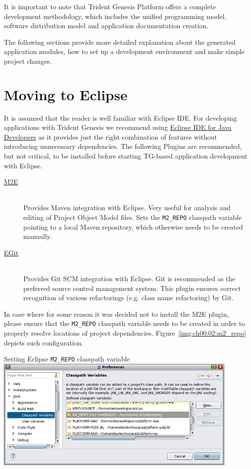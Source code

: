   It is important to note that Trident Genesis Platform offers a complete development methodology, which includes the unified programming model, software distribution model and application documentation creation.
  
  The following sections provide more detailed explanation about the generated application modules, how to set up a development environment and make simple project changes.

\section{Moving to Eclipse}
  It is assumed that the reader is well familiar with Eclipse IDE.
  For developing applications with Trident Genesis we recommend using \href{http://www.eclipse.org/downloads}{Eclipse IDE for Java Developers} as it provides just the right combination of features without introducing unnecessary dependencies.
  The following Plugins are recommended, but not critical, to be installed before starting TG-based application development with Eclipse.

  \begin{description}
    \item[\href{http://www.eclipse.org/m2e/}{M2E}] \hfill \\
	Provides Maven integration with Eclipse. 
	Very useful for analysis and editing of Project Object Model files.
	Sets the \texttt{M2\_REPO} classpath variable pointing to a local Maven repository, which otherwise needs to be created manually.
    \item[\href{http://www.eclipse.org/egit/}{EGit}] \hfill \\
	Provides Git SCM integration with Eclipse. 
	Git is recommended as the preferred source control management system. 
	This plugin ensures correct recognition of various refactorings (e.g. class name refactoring) by Git.
  \end{description}

  In case where for some reason it was decided not to install the M2E plugin, please ensure that the \texttt{M2\_REPO} classpath variable needs to be created in order to properly resolve locations of project dependencies. 
  Figure~\ref{img:ch00:02:m2_repo} depicts such configuration.

  \begin{image}{Setting Eclipse \texttt{M2\_REPO} classpath variable}{\label{img:ch00:02:m2_repo}}    
    \includegraphics[width=0.9\textwidth]{parts/00-part/chapters/01-application-modules/images/06-eclipse-m2-variable.png}
  \end{image}

